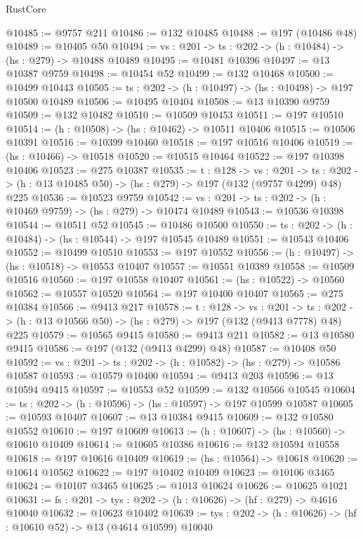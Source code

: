 \begin{lexlean}{RustCore}
\begin{coremodule}
@10485 := @9757 @211
@10486 := @132 @10485
@10488 := @197 (@10486 @48)
@10489 := @10405 @50
@10494 := {vs : @201} -> {ts : @202} -> (h : @10484) -> (hs : @279) -> @10488 @10489
@10495 := @10481 @10396
@10497 := @13 @10387 @9759
@10498 := @10454 @52
@10499 := @132 @10468
@10500 := @10499 @10443
@10505 := {ts : @202} -> (h : @10497) -> (hs : @10498) -> @197 @10500 @10489
@10506 := @10495 @10404
@10508 := @13 @10390 @9759
@10509 := @132 @10482
@10510 := @10509 @10453
@10511 := @197 @10510
@10514 := (h : @10508) -> (hs : @10462) -> @10511 @10406
@10515 := @10506 @10391
@10516 := @10399 @10460
@10518 := @197 @10516 @10406
@10519 := (hs : @10466) -> @10518
@10520 := @10515 @10464
@10522 := @197 @10398 @10406
@10523 := @275 @10387
@10535 := {t : @128} ->
  {vs : @201} ->
  {ts : @202} -> (h : @13 @10485 @50) -> (hs : @279) -> @197 (@132 (@9757 @4299) @48) @225
@10536 := @10523 @9759
@10542 := {vs : @201} -> {ts : @202} -> (h : @10469 @9759) -> (hs : @279) -> @10474 @10489
@10543 := @10536 @10398
@10544 := @10511 @52
@10545 := @10486 @10500
@10550 := {ts : @202} -> (h : @10484) -> (hs : @10544) -> @197 @10545 @10489
@10551 := @10543 @10406
@10552 := @10499 @10510
@10553 := @197 @10552
@10556 := (h : @10497) -> (hs : @10518) -> @10553 @10407
@10557 := @10551 @10389
@10558 := @10509 @10516
@10560 := @197 @10558 @10407
@10561 := (hs : @10522) -> @10560
@10562 := @10557 @10520
@10564 := @197 @10400 @10407
@10565 := @275 @10384
@10566 := @9413 @217
@10578 := {t : @128} ->
  {vs : @201} ->
  {ts : @202} -> (h : @13 @10566 @50) -> (hs : @279) -> @197 (@132 (@9413 @7778) @48) @225
@10579 := @10565 @9415
@10580 := @9413 @211
@10582 := @13 @10580 @9415
@10586 := @197 (@132 (@9413 @4299) @48)
@10587 := @10408 @50
@10592 := {vs : @201} -> {ts : @202} -> (h : @10582) -> (hs : @279) -> @10586 @10587
@10593 := @10579 @10400
@10594 := @9413 @203
@10596 := @13 @10594 @9415
@10597 := @10553 @52
@10599 := @132 @10566 @10545
@10604 := {ts : @202} -> (h : @10596) -> (hs : @10597) -> @197 @10599 @10587
@10605 := @10593 @10407
@10607 := @13 @10384 @9415
@10609 := @132 @10580 @10552
@10610 := @197 @10609
@10613 := (h : @10607) -> (hs : @10560) -> @10610 @10409
@10614 := @10605 @10386
@10616 := @132 @10594 @10558
@10618 := @197 @10616 @10409
@10619 := (hs : @10564) -> @10618
@10620 := @10614 @10562
@10622 := @197 @10402 @10409
@10623 := @10106 @3465
@10624 := @10107 @3465
@10625 := @1013 @10624
@10626 := @10625 @1021
@10631 := {fs : @201} -> {tys : @202} -> (h : @10626) -> (hf : @279) -> @4616 @10040
@10632 := @10623 @10402
@10639 := {tys : @202} -> (h : @10626) -> (hf : @10610 @52) -> @13 (@4614 @10599) @10040

\end{coremodule}
\end{lexlean}
